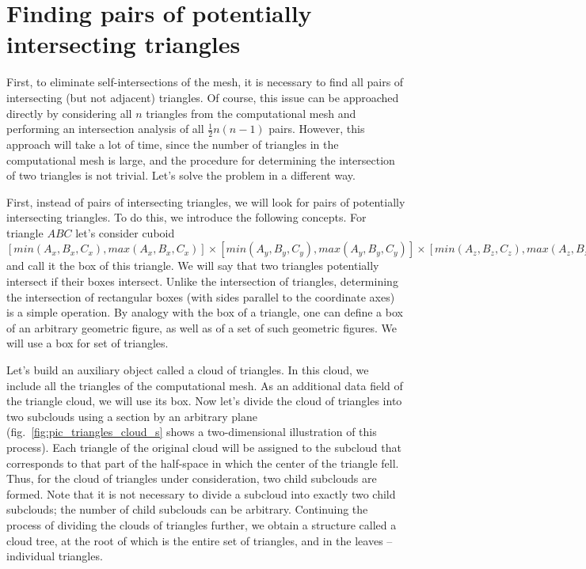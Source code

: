 \documentclass[
11pt,%
tightenlines,%
twoside,%
onecolumn,%
nofloats,%
nobibnotes,%
nofootinbib,%
superscriptaddress,%
noshowpacs,%
centertags]%
{revtex4}
\begin{document}
\section{Finding pairs of potentially intersecting triangles}

First, to eliminate self-intersections of the mesh, it is necessary to find all pairs of intersecting (but not adjacent) triangles.
Of course, this issue can be approached directly by considering all $n$ triangles from the computational mesh and performing an intersection analysis of all $\frac{1}{2}n(n - 1)$ pairs.
However, this approach will take a lot of time, since the number of triangles in the computational mesh is large, and the procedure for determining the intersection of two triangles is not trivial.
Let's solve the problem in a different way.

First, instead of pairs of intersecting triangles, we will look for pairs of potentially intersecting triangles.
To do this, we introduce the following concepts.
For triangle $ABC$ let's consider cuboid $[min(A_x, B_x, C_x), max(A_x, B_x, C_x)] \times [min(A_y, B_y, C_y), max(A_y, B_y, C_y) ] \times [min(A_z, B_z, C_z), max(A_z, B_z, C_z)]$ and call it the box of this triangle.
We will say that two triangles potentially intersect if their boxes intersect.
Unlike the intersection of triangles, determining the intersection of rectangular boxes (with sides parallel to the coordinate axes) is a simple operation.
By analogy with the box of a triangle, one can define a box of an arbitrary geometric figure, as well as of a set of such geometric figures.
We will use a box for set of triangles.

Let's build an auxiliary object called a cloud of triangles.
In this cloud, we include all the triangles of the computational mesh.
As an additional data field of the triangle cloud, we will use its box.
Now let's divide the cloud of triangles into two subclouds using a section by an arbitrary plane (fig.~\ref{fig:pic_triangles_cloud_s} shows a two-dimensional illustration of this process).
Each triangle of the original cloud will be assigned to the subcloud that corresponds to that part of the half-space in which the center of the triangle fell.
Thus, for the cloud of triangles under consideration, two child subclouds are formed.
Note that it is not necessary to divide a subcloud into exactly two child subclouds; the number of child subclouds can be arbitrary.
Continuing the process of dividing the clouds of triangles further, we obtain a structure called a cloud tree, at the root of which is the entire set of triangles, and in the leaves -- individual triangles.
\end{document}
